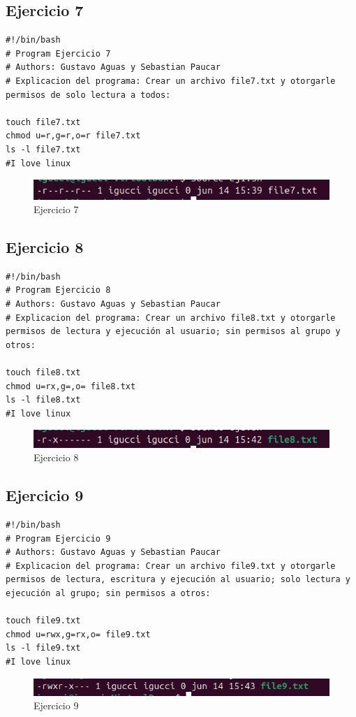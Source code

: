 \documentclass[11pt,twoside]{book}
\begin{document}
\subsection{Ejercicio 7}
\begin{lstlisting}
#!/bin/bash
# Program Ejercicio 7
# Authors: Gustavo Aguas y Sebastian Paucar
# Explicacion del programa: Crear un archivo file7.txt y otorgarle permisos de solo lectura a todos:

touch file7.txt
chmod u=r,g=r,o=r file7.txt
ls -l file7.txt
#I love linux
\end{lstlisting}
\begin{figure}
    \centering
    \includegraphics[width=1\linewidth]{psimb/ej7.png}
    \caption{Ejercicio 7}
\end{figure}
\newpage
\subsection{Ejercicio 8}
\begin{lstlisting}
#!/bin/bash
# Program Ejercicio 8
# Authors: Gustavo Aguas y Sebastian Paucar
# Explicacion del programa: Crear un archivo file8.txt y otorgarle permisos de lectura y ejecución al usuario; sin permisos al grupo y otros:

touch file8.txt
chmod u=rx,g=,o= file8.txt
ls -l file8.txt
#I love linux
\end{lstlisting}
\begin{figure}
    \centering
    \includegraphics[width=1\linewidth]{psimb/ej8.png}
    \caption{Ejercicio 8}
\end{figure}
\newpage
\subsection{Ejercicio 9}
\begin{lstlisting}
#!/bin/bash
# Program Ejercicio 9
# Authors: Gustavo Aguas y Sebastian Paucar
# Explicacion del programa: Crear un archivo file9.txt y otorgarle permisos de lectura, escritura y ejecución al usuario; solo lectura y ejecución al grupo; sin permisos a otros:

touch file9.txt
chmod u=rwx,g=rx,o= file9.txt
ls -l file9.txt
#I love linux
\end{lstlisting}
\begin{figure}
    \centering
    \includegraphics[width=1\linewidth]{psimb/ej9.png}
    \caption{Ejercicio 9}
\end{figure}
\newpage
\end{document}
